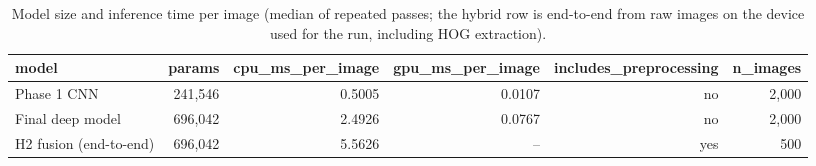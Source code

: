 \begin{table}[t]
\centering
\caption{Model size and inference time per image (median of repeated passes; the hybrid row is end-to-end from raw images on the device used for the run, including HOG extraction).}
\label{tab:p2_inference}
\footnotesize
\begin{tabular}{lrrrrr}
\toprule
model & params & cpu\_ms\_per\_image & gpu\_ms\_per\_image & includes\_preprocessing & n\_images \\
\midrule
Phase 1 CNN & 241,546 & 0.5005 & 0.0107 & no & 2,000 \\
Final deep model & 696,042 & 2.4926 & 0.0767 & no & 2,000 \\
H2 fusion (end-to-end) & 696,042 & 5.5626 & -- & yes & 500 \\
\bottomrule
\end{tabular}
\end{table}
